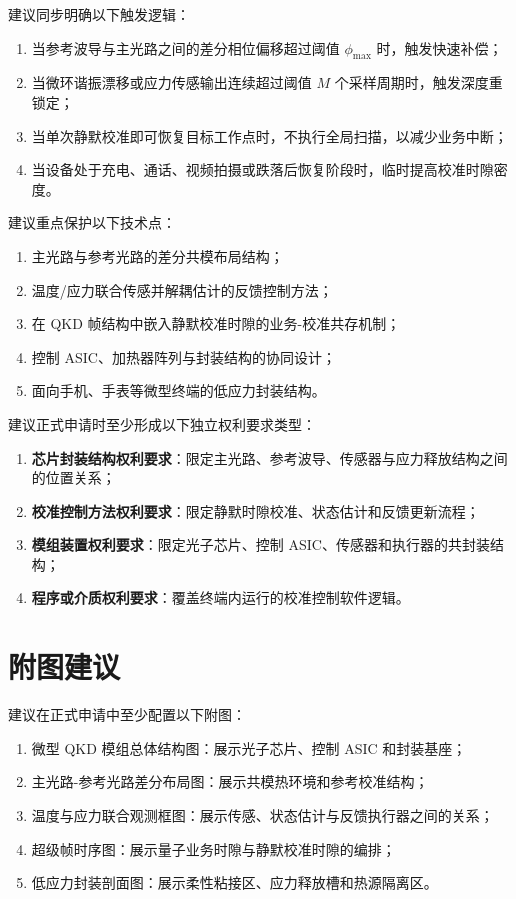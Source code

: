 \documentclass[12pt,a4paper]{article}
\begin{document}
建议同步明确以下触发逻辑：
\begin{enumerate}[label=(\arabic*)]
    \item 当参考波导与主光路之间的差分相位偏移超过阈值 $\phi_{\max}$ 时，触发快速补偿；
    \item 当微环谐振漂移或应力传感输出连续超过阈值 $M$ 个采样周期时，触发深度重锁定；
    \item 当单次静默校准即可恢复目标工作点时，不执行全局扫描，以减少业务中断；
    \item 当设备处于充电、通话、视频拍摄或跌落后恢复阶段时，临时提高校准时隙密度。
\end{enumerate}

建议重点保护以下技术点：
\begin{enumerate}[label=(\arabic*)]
    \item 主光路与参考光路的差分共模布局结构；
    \item 温度/应力联合传感并解耦估计的反馈控制方法；
    \item 在 QKD 帧结构中嵌入静默校准时隙的业务-校准共存机制；
    \item 控制 ASIC、加热器阵列与封装结构的协同设计；
    \item 面向手机、手表等微型终端的低应力封装结构。
\end{enumerate}

建议正式申请时至少形成以下独立权利要求类型：
\begin{enumerate}[label=(\arabic*)]
    \item \textbf{芯片封装结构权利要求}：限定主光路、参考波导、传感器与应力释放结构之间的位置关系；
    \item \textbf{校准控制方法权利要求}：限定静默时隙校准、状态估计和反馈更新流程；
    \item \textbf{模组装置权利要求}：限定光子芯片、控制 ASIC、传感器和执行器的共封装结构；
    \item \textbf{程序或介质权利要求}：覆盖终端内运行的校准控制软件逻辑。
\end{enumerate}

\section{附图建议}

建议在正式申请中至少配置以下附图：
\begin{enumerate}[label=(\arabic*)]
    \item 微型 QKD 模组总体结构图：展示光子芯片、控制 ASIC 和封装基座；
    \item 主光路-参考光路差分布局图：展示共模热环境和参考校准结构；
    \item 温度与应力联合观测框图：展示传感、状态估计与反馈执行器之间的关系；
    \item 超级帧时序图：展示量子业务时隙与静默校准时隙的编排；
    \item 低应力封装剖面图：展示柔性粘接区、应力释放槽和热源隔离区。
\end{enumerate}
\end{document}
